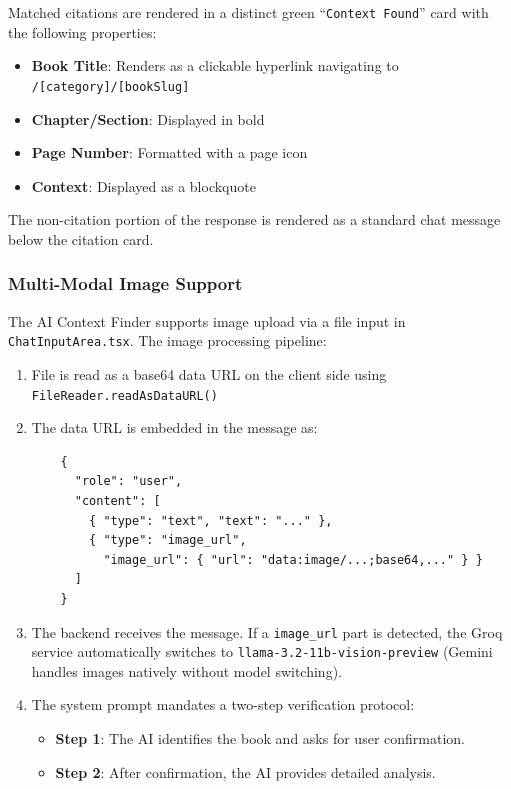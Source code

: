 \documentclass[11pt,a4paper]{article}
\begin{document}
Matched citations are rendered in a distinct green ``\texttt{Context Found}'' card with the following properties:

\begin{itemize}
    \item \textbf{Book Title}: Renders as a clickable hyperlink navigating to \texttt{/[category]/[bookSlug]}
    \item \textbf{Chapter/Section}: Displayed in bold
    \item \textbf{Page Number}: Formatted with a page icon
    \item \textbf{Context}: Displayed as a blockquote
\end{itemize}

The non-citation portion of the response is rendered as a standard chat message below the citation card.

\subsubsection{Multi-Modal Image Support}

The AI Context Finder supports image upload via a file input in \texttt{ChatInputArea.tsx}. The image processing pipeline:

\begin{enumerate}
    \item File is read as a base64 data URL on the client side using \texttt{FileReader.readAsDataURL()}
    \item The data URL is embedded in the message as:
    \begin{verbatim}
    {
      "role": "user",
      "content": [
        { "type": "text", "text": "..." },
        { "type": "image_url",
          "image_url": { "url": "data:image/...;base64,..." } }
      ]
    }
    \end{verbatim}
    \item The backend receives the message. If a \texttt{image\_url} part is detected, the Groq service automatically switches to \texttt{llama-3.2-11b-vision-preview} (Gemini handles images natively without model switching).
    \item The system prompt mandates a two-step verification protocol:
    \begin{itemize}
        \item \textbf{Step 1}: The AI identifies the book and asks for user confirmation.
        \item \textbf{Step 2}: After confirmation, the AI provides detailed analysis.
    \end{itemize}
\end{enumerate}
\clearpage
\end{document}
